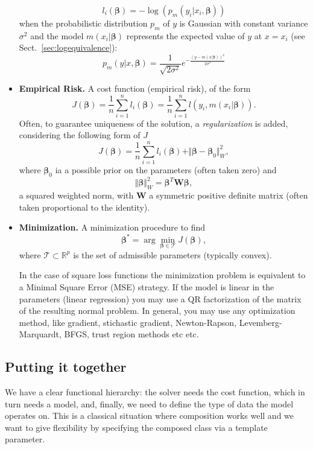 \documentclass{article}
\begin{document}
\begin{itemize}
\begin{equation}
 l_i(\boldsymbol{\beta})=-\log(p_m(y_i|x_i,\boldsymbol{\beta}))
 \end{equation}
   when the probabilistic distribution $p_m$ of $y$ is Gaussian with constant variance $\sigma^2$ and the model $m(x_i|\boldsymbol{\beta})$ represents the expected value of $y$ at $x=x_i$ (see Sect.~\ref{sec:logequivalence}):
   \[
      p_m(y|x,\boldsymbol{\beta})=\frac{1}{\sqrt{2\sigma^2}}e^{-\frac{(y-m(x|\boldsymbol{\beta}))^2}{2\sigma^2}}
   \]
    \item \textbf{Empirical Risk.}  A cost function (empirical risk), of the form
    \begin{equation}\label{eq:empiricalr}
    J(\boldsymbol{\beta})=\frac{1}{n}\sum_{i=1}^{n} l_i(\boldsymbol{\beta})=\frac{1}{n}\sum_{i=1}^{n}l(y_i,m(x_i|\boldsymbol{\beta})).
    \end{equation}
    Often, to guarantee uniqueness of the solution, a \emph{regularization} is added, considering the following form of $J$
     \begin{equation}\label{eq:empiricalrreg}
   J(\boldsymbol{\beta})=\frac{1}{n}\sum_{i=1}^{n} l_i(\boldsymbol{\beta})+\Vert\boldsymbol{\beta}-\boldsymbol{\beta}_0\Vert^2_W,
   \end{equation}
    where $\boldsymbol{\beta}_0$ ia a possible prior on the parameters (often taken zero) and 
    \[
    \Vert\boldsymbol{\beta}\Vert^2_W=\boldsymbol{\beta}^T \mathbf{W} \boldsymbol{\beta},
    \]
    a squared weighted norm, with $\mathbf{W}$ a symmetric positive definite matrix (often taken proportional to the identity).
    \item \textbf{Minimization.} A minimization procedure to find
    \begin{equation}
    \label{eq:minim}
    \boldsymbol{\beta}^*=\arg\min_{\boldsymbol{\beta}\in \mathcal{T}}J(\boldsymbol{\beta}),
    \end{equation}
    where $\mathcal{T}\subset\mathbb{R}^p$ is the set of admissible parameters (typically convex).
    
     In the case of square loss functions the minimization problem is equivalent to a Minimal Square Error (MSE) strategy. 
     If the model is linear in the parameters (linear regression) you may use a QR factorization of the matrix of the resulting normal problem. In general, you may use any optimization method, like gradient, stichastic gradient, Newton-Rapson, Levemberg-Marquardt, BFGS, trust region methods etc etc.
\end{itemize}


 \subsection{Putting it together}
 We have a clear functional hierarchy: the solver needs the cost function, which in turn needs a model, and, finally, we need to define the type of data
 the model operates on. This is a classical situation where composition
 works well and we want to give flexibility by specifying the composed class via
 a template parameter.
 
\end{document}
